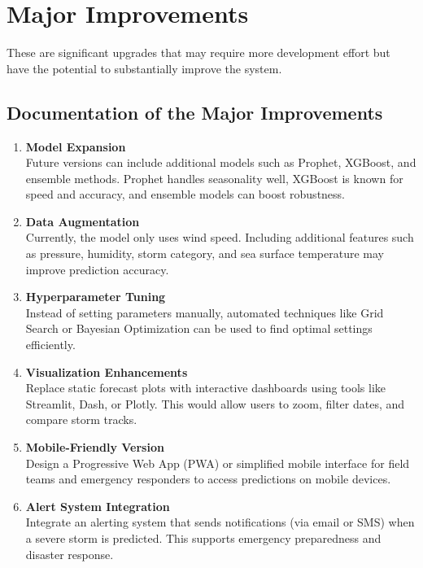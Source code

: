 \section{Major Improvements}

These are significant upgrades that may require more development effort but have the potential to substantially improve the system.

\subsection{Documentation of the Major Improvements}

\begin{enumerate}
	\item \textbf{Model Expansion} \\
	Future versions can include additional models such as Prophet, XGBoost, and ensemble methods. Prophet handles seasonality well, XGBoost is known for speed and accuracy, and ensemble models can boost robustness. \cite{MDPI2024Ensemble}
	
	\item \textbf{Data Augmentation} \\
	Currently, the model only uses wind speed. Including additional features such as pressure, humidity, storm category, and sea surface temperature may improve prediction accuracy. \cite{Emanuel2005}
	
	\item \textbf{Hyperparameter Tuning} \\
	Instead of setting parameters manually, automated techniques like Grid Search or Bayesian Optimization can be used to find optimal settings efficiently.
	
	\item \textbf{Visualization Enhancements} \\
	Replace static forecast plots with interactive dashboards using tools like Streamlit, Dash, or Plotly. This would allow users to zoom, filter dates, and compare storm tracks.
	
	\item \textbf{Mobile-Friendly Version} \\
	Design a Progressive Web App (PWA) or simplified mobile interface for field teams and emergency responders to access predictions on mobile devices.
	
	\item \textbf{Alert System Integration} \\
	Integrate an alerting system that sends notifications (via email or SMS) when a severe storm is predicted. This supports emergency preparedness and disaster response. \cite{FEMAIPAWS}
\end{enumerate}
